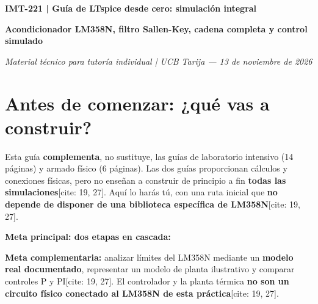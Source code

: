 \documentclass[10pt, a4paper]{article}
\begin{document}
\begin{center}
    {\LARGE \textbf{IMT-221 | Guía de LTspice desde cero: simulación integral}}
    \par\vspace{0.15cm}
    {\large \textbf{Acondicionador LM358N, filtro Sallen-Key, cadena completa y control simulado}}
    \par\vspace{0.1cm}
    \textit{Material técnico para tutoría individual | UCB Tarija — 13 de noviembre de 2026}
\end{center}

\section*{Antes de comenzar: ¿qué vas a construir?}
Esta guía \textbf{complementa}, no sustituye, las guías de laboratorio intensivo (14 páginas) y armado físico (6 páginas). Las dos guías proporcionan cálculos y conexiones físicas, pero no enseñan a construir de principio a fin \textbf{todas las simulaciones}[cite: 19, 27]. Aquí lo harás tú, con una ruta inicial que \textbf{no depende de disponer de una biblioteca específica de LM358N}[cite: 19, 27].

\textbf{Meta principal: dos etapas en cascada:}
\begin{center}
\end{center}

\textbf{Meta complementaria:} analizar límites del LM358N mediante un \textbf{modelo real documentado}, representar un modelo de planta ilustrativo y comparar controles P y PI[cite: 19, 27]. El controlador y la planta térmica \textbf{no son un circuito físico conectado al LM358N de esta práctica}[cite: 19, 27].
\end{document}
